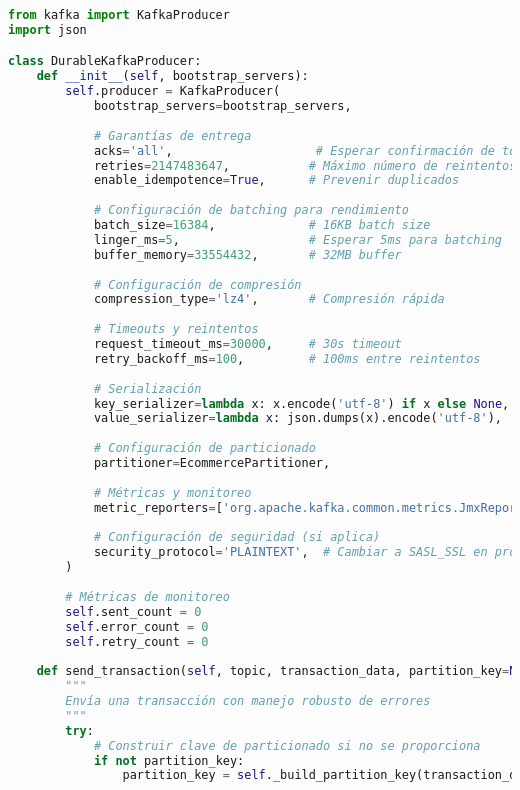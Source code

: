 \begin{lstlisting}[language=python, caption=Configuración de Productor con Garantías Estrictas, label=lst:producer_config]
from kafka import KafkaProducer
import json

class DurableKafkaProducer:
    def __init__(self, bootstrap_servers):
        self.producer = KafkaProducer(
            bootstrap_servers=bootstrap_servers,
            
            # Garantías de entrega
            acks='all',                    # Esperar confirmación de todas las réplicas
            retries=2147483647,           # Máximo número de reintentos
            enable_idempotence=True,      # Prevenir duplicados
            
            # Configuración de batching para rendimiento
            batch_size=16384,             # 16KB batch size
            linger_ms=5,                  # Esperar 5ms para batching
            buffer_memory=33554432,       # 32MB buffer
            
            # Configuración de compresión
            compression_type='lz4',       # Compresión rápida
            
            # Timeouts y reintentos
            request_timeout_ms=30000,     # 30s timeout
            retry_backoff_ms=100,         # 100ms entre reintentos
            
            # Serialización
            key_serializer=lambda x: x.encode('utf-8') if x else None,
            value_serializer=lambda x: json.dumps(x).encode('utf-8'),
            
            # Configuración de particionado
            partitioner=EcommercePartitioner,
            
            # Métricas y monitoreo
            metric_reporters=['org.apache.kafka.common.metrics.JmxReporter'],
            
            # Configuración de seguridad (si aplica)
            security_protocol='PLAINTEXT',  # Cambiar a SASL_SSL en producción
        )
        
        # Métricas de monitoreo
        self.sent_count = 0
        self.error_count = 0
        self.retry_count = 0
    
    def send_transaction(self, topic, transaction_data, partition_key=None):
        """
        Envía una transacción con manejo robusto de errores
        """
        try:
            # Construir clave de particionado si no se proporciona
            if not partition_key:
                partition_key = self._build_partition_key(transaction_data)
            

\end{lstlisting}
